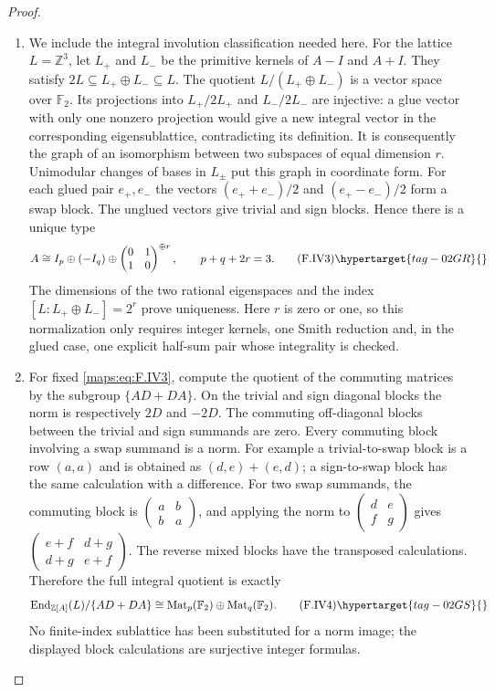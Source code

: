 \begin{proof}
\begin{enumerate}[label={$\langle1\rangle$\arabic*.}]
\item We include the integral involution classification needed here.
For the lattice $L=\mathbb Z^3$, let $L_+$ and $L_-$ be the
primitive kernels of $A-I$ and $A+I$.  They satisfy
$2L\subseteq L_+\oplus L_-\subseteq L$.
The quotient $L/(L_+\oplus L_-)$ is a vector space over
$\mathbb F_2$.  Its projections into $L_+/2L_+$ and
$L_-/2L_-$ are injective: a glue vector with only one
nonzero projection would give a new integral vector in the
corresponding eigensublattice, contradicting its definition.
It is consequently the graph of an isomorphism between two
subspaces of equal dimension $r$.
Unimodular changes of bases in $L_\pm$ put this graph in
coordinate form.  For each glued pair $e_+,e_-$ the vectors
$(e_++e_-)/2$ and $(e_+-e_-)/2$ form a swap block.
The unglued vectors give trivial and sign blocks.  Hence
there is a unique type
\[
 A\cong I_p\oplus(-I_q)\oplus
 \begin{pmatrix}0&1\\1&0\end{pmatrix}^{\oplus r},
 \qquad p+q+2r=3.                                         \tag{F.IV3}\hypertarget{tag-02GR}{}\label{maps:eq:F.IV3}
\]
The dimensions of the two rational eigenspaces and the
index $[L:L_+\oplus L_-]=2^r$ prove uniqueness.
Here $r$ is zero or one, so this normalization only requires
integer kernels, one Smith reduction and, in the glued case,
one explicit half-sum pair whose integrality is checked.

\item For fixed \eqref{maps:eq:F.IV3}, compute the quotient of the commuting
matrices by the subgroup $\{AD+DA\}$.
On the trivial and sign diagonal blocks the norm is
respectively $2D$ and $-2D$.  The commuting off-diagonal
blocks between the trivial and sign summands are zero.
Every commuting block involving a swap summand is a norm.
For example a trivial-to-swap block is a row $(a,a)$ and
is obtained as $(d,e)+(e,d)$; a sign-to-swap block has the
same calculation with a difference.  For two swap summands,
the commuting block is
$\begin{pmatrix}a&b\\b&a\end{pmatrix}$, and applying the
norm to $\begin{pmatrix}d&e\\f&g\end{pmatrix}$ gives
$\begin{pmatrix}e+f&d+g\\d+g&e+f\end{pmatrix}$.
The reverse mixed blocks have the transposed calculations.
Therefore the full integral quotient is exactly
\[
 \operatorname{End}_{\mathbb Z[A]}(L)/\{AD+DA\}
 \cong \operatorname{Mat}_p(\mathbb F_2)
       \oplus\operatorname{Mat}_q(\mathbb F_2).             \tag{F.IV4}\hypertarget{tag-02GS}{}\label{maps:eq:F.IV4}
\]
No finite-index sublattice has been substituted for a norm
image; the displayed block calculations are surjective
integer formulas.


\end{enumerate}
\end{proof}
